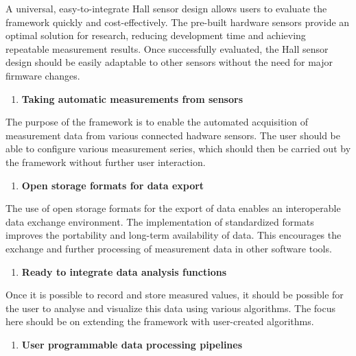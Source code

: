 A universal, easy-to-integrate Hall sensor design allows users to
evaluate the framework quickly and cost-effectively. The pre-built
hardware sensors provide an optimal solution for research, reducing
development time and achieving repeatable measurement results. Once
successfully evaluated, the Hall sensor design should be easily
adaptable to other sensors without the need for major firmware changes.

\begin{enumerate}
\def\labelenumi{\arabic{enumi}.}
\setcounter{enumi}{1}
\tightlist
\item
  \textbf{Taking automatic measurements from sensors}
\end{enumerate}

The purpose of the framework is to enable the automated acquisition of
measurement data from various connected hadware sensors. The user should
be able to configure various measurement series, which should then be
carried out by the framework without further user interaction.

\begin{enumerate}
\def\labelenumi{\arabic{enumi}.}
\setcounter{enumi}{2}
\tightlist
\item
  \textbf{Open storage formats for data export}
\end{enumerate}

The use of open storage formats for the export of data enables an
interoperable data exchange environment. The implementation of
standardized formats improves the portability and long-term availability
of data. This encourages the exchange and further processing of
measurement data in other software tools.

\begin{enumerate}
\def\labelenumi{\arabic{enumi}.}
\setcounter{enumi}{3}
\tightlist
\item
  \textbf{Ready to integrate data analysis functions}
\end{enumerate}

Once it is possible to record and store measured values, it should be
possible for the user to analyse and visualize this data using various
algorithms. The focus here should be on extending the framework with
user-created algorithms.

\begin{enumerate}
\def\labelenumi{\arabic{enumi}.}
\setcounter{enumi}{4}
\tightlist
\item
  \textbf{User programmable data processing pipelines}
\end{enumerate}


